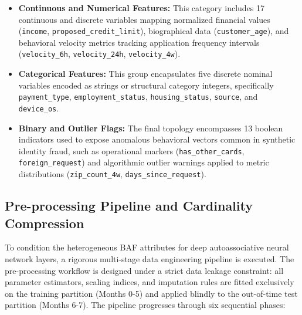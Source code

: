 \documentclass[11pt,a4paper]{report}
\begin{document}
\begin{itemize}
    \item \textbf{Continuous and Numerical Features:} This category includes 17 continuous and discrete variables mapping normalized financial values (\texttt{income}, \texttt{proposed\_credit\_limit}), biographical data (\texttt{customer\_age}), and behavioral velocity metrics tracking application frequency intervals (\texttt{velocity\_6h}, \texttt{velocity\_24h}, \texttt{velocity\_4w}).
    \item \textbf{Categorical Features:} This group encapsulates five discrete nominal variables encoded as strings or structural category integers, specifically \texttt{payment\_type}, \texttt{employment\_status}, \texttt{housing\_status}, \texttt{source}, and \texttt{device\_os}.
    \item \textbf{Binary and Outlier Flags:} The final topology encompasses 13 boolean indicators used to expose anomalous behavioral vectors common in synthetic identity fraud, such as operational markers (\texttt{has\_other\_cards}, \texttt{foreign\_request}) and algorithmic outlier warnings applied to metric distributions (\texttt{zip\_count\_4w}, \texttt{days\_since\_request}).
\end{itemize}

\subsection{Pre-processing Pipeline and Cardinality Compression}
To condition the heterogeneous BAF attributes for deep autoassociative neural network layers, a rigorous multi-stage data engineering pipeline is executed. The pre-processing workflow is designed under a strict data leakage constraint: all parameter estimators, scaling indices, and imputation rules are fitted exclusively on the training partition (Months 0-5) and applied blindly to the out-of-time test partition (Months 6-7). The pipeline progresses through six sequential phases:
\end{document}
